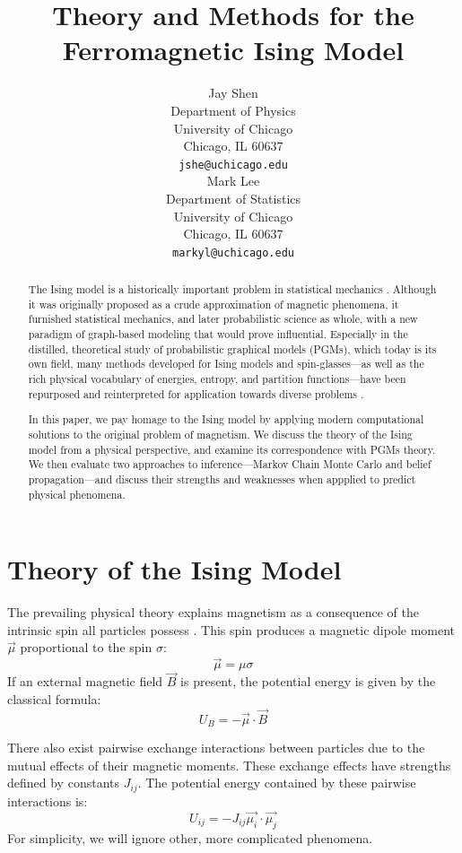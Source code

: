 \documentclass{article}
\title{Theory and Methods for the Ferromagnetic Ising Model}
\author{
    Jay Shen \\
    Department of Physics \\
    University of Chicago\\
    Chicago, IL 60637 \\
    \texttt{jshe@uchicago.edu} \\
    \And
    Mark Lee \\
    Department of Statistics \\
    University of Chicago\\
    Chicago, IL 60637 \\
    \texttt{markyl@uchicago.edu} \\
}
\begin{document}
\graphicspath{ {../graphics} }

\maketitle

\begin{abstract}

The Ising model is a historically important problem in statistical mechanics 
\cite{lenz1920}. 
Although it was originally proposed as a crude approximation of magnetic 
phenomena, it furnished statistical mechanics, and later probabilistic science 
as whole, with a new paradigm of graph-based modeling that would prove 
influential.
Especially in the distilled, theoretical study of probabilistic graphical 
models (PGMs), which today is its own field, many methods developed for Ising 
models and spin-glasses—as well as the rich physical vocabulary of energies, 
entropy, and partition functions—have been repurposed and reinterpreted for 
application towards diverse problems \cite{koller}. 

In this paper, we pay homage to the Ising model by applying modern computational 
solutions to the original problem of magnetism. 
We discuss the theory of the Ising model from a physical perspective, and 
examine its correspondence with PGMs theory. 
We then evaluate two approaches to inference—Markov Chain Monte Carlo and
belief propagation—and discuss their strengths and weaknesses when appplied to 
predict physical phenomena. 
%
%
%
%
%
\end{abstract}
%
%
%
%
%
\section{Theory of the Ising Model}

The prevailing physical theory explains magnetism as a consequence of the 
intrinsic spin all particles possess \cite{griffiths}. 
This spin produces a magnetic dipole moment $\vec{\mu}$ proportional to the 
spin $\sigma$:
\[\vec{\mu} = \mu \sigma\]
If an external magnetic field $\vec{B}$ is present, the potential energy is 
given by the classical formula:
\[U_B = - \vec{\mu} \cdot \vec{B}\]

There also exist pairwise exchange interactions between particles due to the 
mutual effects of their magnetic moments.
These exchange effects have strengths defined by constants $J_{ij}$. 
The potential energy contained by these pairwise interactions is:
\[U_{ij} = - J_{ij} \vec{\mu_i} \cdot \vec{\mu_j}\]
For simplicity, we will ignore other, more complicated phenomena. 
\end{document}
